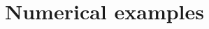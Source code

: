 \documentclass{gnulike}
\begin{document}
\chapter{Numerical examples}

\begin{appendices}




\end{appendices}
  



\clearpage
\newpage
\thispagestyle{empty}
\printindex
\end{document}
